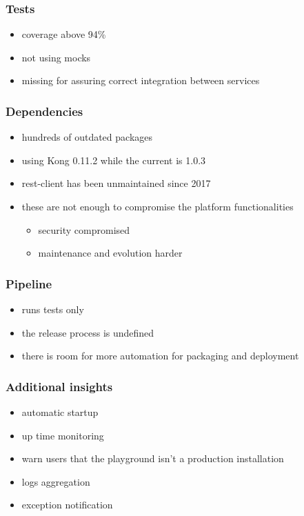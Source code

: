 \documentclass{beamer}
\begin{document}
  \begin{frame}
    \frametitle{Tests}

    \begin{itemize}
      \item coverage above 94\%
      \item not using mocks
      \item missing for assuring correct integration between services
    \end{itemize}
  \end{frame}

  \begin{frame}
    \frametitle{Dependencies}

    \begin{itemize}
      \item hundreds of outdated packages
      \item using Kong 0.11.2 while the current is 1.0.3
      \item rest-client has been unmaintained since 2017
      \item these are not enough to compromise the platform functionalities
        \begin{itemize}
          \item security compromised
          \item maintenance and evolution harder
        \end{itemize}
    \end{itemize}
  \end{frame}

  \begin{frame}
    \frametitle{Pipeline}

    \begin{itemize}
      \item runs tests only
      \item the release process is undefined
      \item there is room for more automation for packaging and deployment
    \end{itemize}
  \end{frame}

  \begin{frame}
    \frametitle{Additional insights}

    \begin{itemize}
      \item automatic startup
      \item up time monitoring
      \item warn users that the playground isn't a production installation
      \item logs aggregation
      \item exception notification
    \end{itemize}
  \end{frame}
\end{document}

